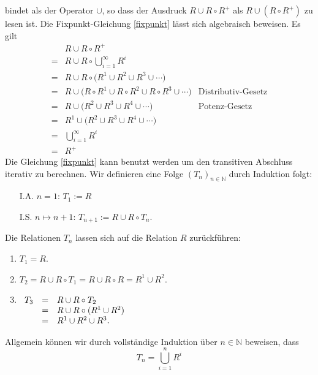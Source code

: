 bindet als der Operator $\cup$, so dass der Ausdruck $R \cup R \circ R^+$ als
$R \cup (R \circ R^+)$ zu lesen ist.
Die Fixpunkt-Gleichung \ref{fixpunkt} lässt sich algebraisch beweisen.  Es gilt
\[
\begin{array}{cll}
    & R \cup R \circ R^+ \\[0.2cm]
  = & R \cup R \circ \bigcup\limits_{i=1}^{\infty} R^i \\[0.4cm]
  = & R \cup R \circ \bigl(R^1 \cup R^2 \cup R^3 \cup \cdots \bigr) \\[0.2cm]
  = & R \cup \bigl(R \circ R^1 \cup R \circ R^2 \cup R \circ R^3 \cup \cdots \bigr) &
      \mbox{Distributiv-Gesetz} \\[0.2cm]
  = & R \cup \bigl(R^2 \cup R^3 \cup  R^4 \cup \cdots \bigr) & \mbox{Potenz-Gesetz} \\[0.2cm]
  = & R^1 \cup \bigl(R^2 \cup R^3 \cup  R^4 \cup \cdots \bigr) \\[0.2cm]
  = & \bigcup\limits_{i=1}^{\infty} R^i \\[0.4cm]
  = & R^+
\end{array}
\]
Die Gleichung \ref{fixpunkt} kann benutzt werden um den transitiven Abschluss iterativ zu
berechnen.  Wir definieren eine Folge $(T_n)_{n \in \mathbb{N}}$ durch Induktion folgt:
\begin{enumerate}
\item[I.A.] $n = 1$:         \hspace*{2.3cm} $T_1 := R$
\item[I.S.] $n \mapsto n+1$: \hspace*{1.6cm} $T_{n+1} := R \cup R \circ T_n$. 
\end{enumerate}
Die Relationen $T_n$ lassen sich auf die Relation $R$ zurückführen:
\begin{enumerate}
\item $T_1 = R$.
\item $T_2 = R \cup R \circ T_1 = R \cup R \circ R = R^1 \cup R^2$.
\item $\begin{array}[t]{lcl}
       T_3  & = & R \cup R \circ T_2 \\
            & = & R \cup R \circ (R^1 \cup R^2) \\
            & = & R^1 \cup R^2 \cup R^3. \\
       \end{array}
      $
\end{enumerate}
Allgemein können wir durch vollständige Induktion über $n \in \mathbb{N}$ beweisen, dass
\[ T_n = \bigcup\limits_{i=1}^{n} R^i \]
